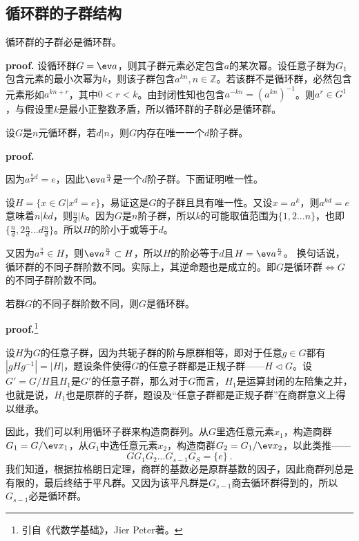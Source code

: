 \subsection{循环群的子群结构}
\begin{theorem}{}\label{the_cyclic_1}
循环群的子群必是循环群。
\end{theorem}
\textbf{proof.}
设循环群$G=\ev a$，则其子群元素必定包含$a$的某次幂。设任意子群为$G_1$包含元素的最小次幂为$k$，则该子群包含$a^{kn},n\in \mathbb Z$。若该群不是循环群，必然包含元素形如$a^{kn+r}$，其中$0< r<k$。由封闭性知也包含$a^{-kn}=(a^{kn})^{-1}$。则$a^{r}\in G^{1}$，与假设里$k$是最小正整数矛盾，所以循环群的子群必是循环群。
\begin{theorem}{}
设$G$是$n$元循环群，若$d|n$，则$G$内存在唯一一个$d$阶子群。
\end{theorem}
\textbf{proof.}

因为$a^{\frac{n}{d}d}=e$，因此$\ev a^{\frac{n}{d}}$是一个$d$阶子群。下面证明唯一性。

设$H=\{x\in G|x^d=e\}$，易证这是$G$的子群且具有唯一性。又设$x=a^k$，则$a^{kd}=e$意味着$n|kd$，则$\frac{n}{d}|k$。因为$G$是$n$阶子群，所以$k$的可能取值范围为$\{1,2...n\}$，也即$\{\frac{n}{d},2\frac{n}{d}...d\frac{n}{d}\}$。所以$H$的阶小于或等于$d$。

又因为$a^{\frac{n}{d}}\in H$，则$\ev a^{\frac{n}{d}}\subset H$，所以$H$的阶必等于$d$且$H=\ev a^{\frac{n}{d}}$。
换句话说，循环群的不同子群阶数不同。实际上，其逆命题也是成立的。即$G$是循环群$\Longleftrightarrow G$的不同子群阶数不同。
\begin{theorem}{}
若群$G$的不同子群阶数不同，则$G$是循环群。
\end{theorem}
\textbf{proof.}\footnote{引自《代数学基础》，Jier Peter著。}

设$H$为$G$的任意子群，因为共轭子群的阶与原群相等，即对于任意$g\in G$都有$|gHg^{-1}|=|H|$，题设条件使得$G$的任意子群都是正规子群——$H\lhd G$。设$G'=G/H$且$H_1$是$G'$的任意子群，那么对于$G$而言，$H_1$是运算封闭的左陪集之并，也就是说，$H_1$也是原群的子群，题设及“任意子群都是正规子群”在商群意义上得以继承。

因此，我们可以利用循环子群来构造商群列。从$G$里选任意元素$x_1$，构造商群$G_1=G/\ev x_1$，从$G_1$中选任意元素$x_2$，构造商群$G_2=G_1/\ev x_2$，以此类推——
\begin{equation}
GG_1G_2...G_{s-1}G_S=\{e\}~.
\end{equation}
我们知道，根据拉格朗日定理，商群的基数必是原群基数的因子，因此商群列总是有限的，最后终结于平凡群。又因为该平凡群是$G_{s-1}$商去循环群得到的，所以$G_{s-1}$必是循环群。

